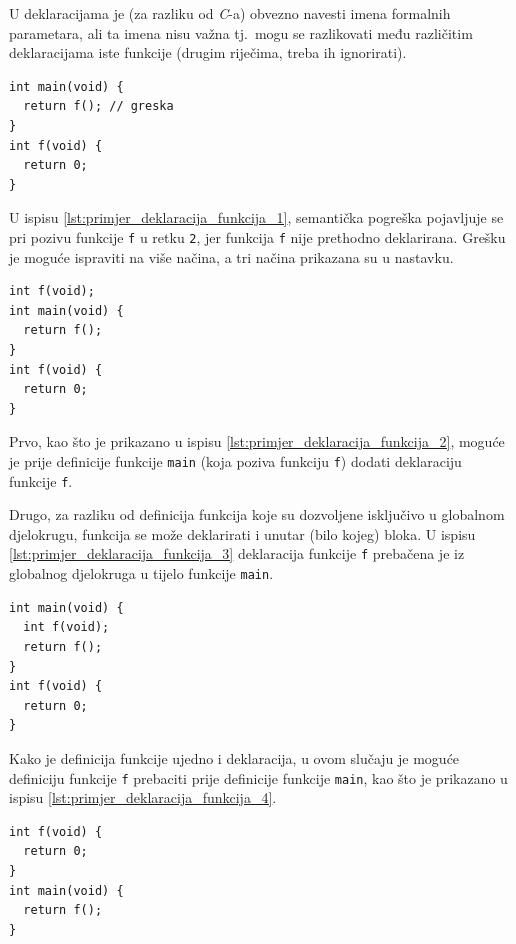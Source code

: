 \documentclass[times, 12pt, utf8]{book}
\begin{document}
U deklaracijama je (za razliku od \emph{C}-a) obvezno navesti imena formalnih parametara, ali ta imena nisu važna tj.~mogu se razlikovati među različitim deklaracijama iste funkcije (drugim riječima, treba ih ignorirati).

\begin{lstlisting}[caption={Funkcija \texttt{f} nije deklarirana prije korištenja.},label=lst:primjer_deklaracija_funkcija_1]
int main(void) {
  return f(); // greska
}
int f(void) {
  return 0;
}
\end{lstlisting}

U ispisu \ref{lst:primjer_deklaracija_funkcija_1}, semantička pogreška pojavljuje se pri pozivu funkcije \verb|f| u retku \verb|2|, jer funkcija \verb|f| nije prethodno deklarirana.
Grešku je moguće ispraviti na više načina, a tri načina prikazana su u nastavku.

\begin{lstlisting}[caption={Dodatak deklaracije funkcije \texttt{f} prije definicije funkcije \texttt{main}.},label=lst:primjer_deklaracija_funkcija_2]
int f(void);
int main(void) {
  return f();
}
int f(void) {
  return 0;
}
\end{lstlisting}

Prvo, kao što je prikazano u ispisu \ref{lst:primjer_deklaracija_funkcija_2}, moguće je prije definicije funkcije \verb|main| (koja poziva funkciju \verb|f|) dodati deklaraciju funkcije \verb|f|.

Drugo, za razliku od definicija funkcija koje su dozvoljene isključivo u globalnom djelokrugu, funkcija se može deklarirati i unutar (bilo kojeg) bloka.
U ispisu \ref{lst:primjer_deklaracija_funkcija_3} deklaracija funkcije \verb|f| prebačena je iz globalnog djelokruga u tijelo funkcije \verb|main|.

\begin{lstlisting}[caption={Deklaracija funkcije \texttt{f} neposredno prije poziva u tijelu funkcije \texttt{main}.},label=lst:primjer_deklaracija_funkcija_3]
int main(void) {
  int f(void);
  return f();
}
int f(void) {
  return 0;
}
\end{lstlisting}

Kako je definicija funkcije ujedno i deklaracija, u ovom slučaju je moguće definiciju funkcije \verb|f| prebaciti prije definicije funkcije \verb|main|, kao što je prikazano u ispisu \ref{lst:primjer_deklaracija_funkcija_4}.

\begin{lstlisting}[caption={Definicija funkcije \texttt{f} je ujedno i njena deklaracija.},label=lst:primjer_deklaracija_funkcija_4]
int f(void) {
  return 0;
}
int main(void) {
  return f();
}
\end{lstlisting}
\end{document}
